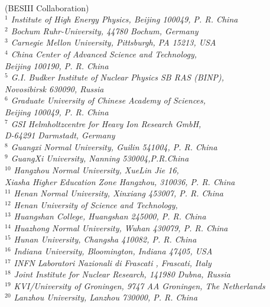 \begin{frontmatter}
{\begin{small}
\\
\vspace{0.2cm}
(BESIII Collaboration)\\
\vspace{0.2cm} {\it
$^{1}$ Institute of High Energy Physics, Beijing 100049, P. R. China\\
$^{2}$ Bochum Ruhr-University, 44780 Bochum, Germany\\
$^{3}$ Carnegie Mellon University, Pittsburgh, PA 15213, USA\\
$^{4}$ China Center of Advanced Science and Technology, \\Beijing 100190, P. R. China\\
$^{5}$ G.I. Budker Institute of Nuclear Physics SB RAS (BINP), \\Novosibirsk 630090, Russia\\
$^{6}$ Graduate University of Chinese Academy of Sciences, \\Beijing 100049, P. R. China\\
$^{7}$ GSI Helmholtzcentre for Heavy Ion Research GmbH, \\D-64291 Darmstadt, Germany\\
$^{8}$ Guangxi Normal University, Guilin 541004, P. R. China\\
$^{9}$ GuangXi University, Nanning 530004,P.R.China\\
$^{10}$ Hangzhou Normal University, XueLin Jie 16,\\ Xiasha Higher Education Zone Hangzhou, 310036, P. R. China\\
$^{11}$ Henan Normal University, Xinxiang 453007, P. R. China\\
$^{12}$ Henan University of Science and Technology, \\
$^{13}$ Huangshan College, Huangshan 245000, P. R. China\\
$^{14}$ Huazhong Normal University, Wuhan 430079, P. R. China\\
$^{15}$ Hunan University, Changsha 410082, P. R. China\\
$^{16}$ Indiana University, Bloomington, Indiana 47405, USA\\
$^{17}$ INFN Laboratori Nazionali di Frascati , Frascati, Italy\\
$^{18}$ Joint Institute for Nuclear Research, 141980 Dubna, Russia\\
$^{19}$ KVI/University of Groningen, 9747 AA Groningen, The Netherlands\\
$^{20}$ Lanzhou University, Lanzhou 730000, P. R. China\\
}
\end{small}}
\end{frontmatter}
